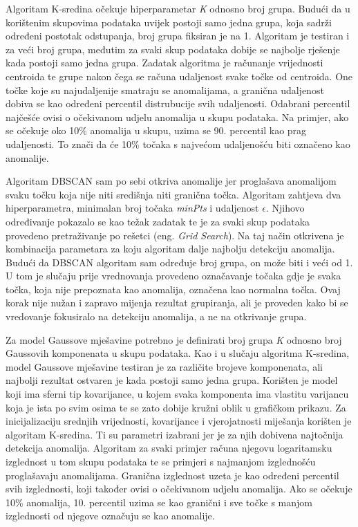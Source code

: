 \documentclass[utf8, diplomski, numeric]{fer}
\begin{document}
Algoritam K-sredina očekuje hiperparametar \textit{K} odnosno broj grupa. Budući da u korištenim skupovima podataka uvijek postoji samo jedna grupa, koja sadrži određeni postotak odstupanja, broj grupa fiksiran je na 1. Algoritam je testiran i za veći broj grupa, međutim za svaki skup podataka dobije se najbolje rješenje kada postoji samo jedna grupa. Zadatak algoritma je računanje vrijednosti centroida te grupe nakon čega se računa udaljenost svake točke od centroida. One točke koje su najudaljenije smatraju se anomalijama, a granična udaljenost dobiva se kao određeni percentil distrubucije svih udaljenosti. Odabrani percentil najčešće ovisi o očekivanom udjelu anomalija u skupu podataka. Na primjer, ako se očekuje oko 10\% anomalija u skupu, uzima se 90. percentil kao prag udaljenosti. To znači da će 10\% točaka s najvećom udaljenošću biti označeno kao anomalije.

Algoritam DBSCAN sam po sebi otkriva anomalije jer proglašava anomalijom svaku točku koja nije niti središnja niti granična točka. Algoritam zahtjeva dva hiperparametra, minimalan broj točaka \textit{minPts} i udaljenost $\epsilon$. Njihovo određivanje pokazalo se kao težak zadatak te je za svaki skup podataka provedeno pretraživanje po rešetci (eng. \textit{Grid Search}). Na taj način otkrivena je kombinacija parametara za koju algoritam dalje najbolju detekciju anomalija. Budući da DBSCAN algoritam sam određuje broj grupa, on može biti i veći od 1. U tom je slučaju prije vrednovanja provedeno označavanje točaka gdje je svaka točka, koja nije prepoznata kao anomalija, označena kao normalna točka. Ovaj korak nije nužan i zapravo mijenja rezultat grupiranja, ali je proveden kako bi se vredovanje fokusiralo na detekciju anomalija, a ne na otkrivanje grupa.

Za model Gaussove mješavine potrebno je definirati broj grupa \textit{K} odnosno broj Gaussovih komponenata u skupu podataka. Kao i u slučaju algoritma K-sredina, model Gaussove mješavine testiran je za različite brojeve komponenata, ali najbolji rezultat ostvaren je kada postoji samo jedna grupa. Korišten je model koji ima sferni tip kovarijance, u kojem svaka komponenta ima vlastitu varijancu koja je ista po svim osima te se zato dobije kružni oblik u grafičkom prikazu. Za inicijalizaciju srednjih vrijednosti, kovarijance i vjerojatnosti miješanja korišten je algoritam K-sredina. Ti su parametri izabrani jer je za njih dobivena najtočnija detekcija anomalija. Algoritam za svaki primjer računa njegovu logaritamsku izglednost u tom skupu podataka te se primjeri s najmanjom izglednošću proglašavaju anomalijama. Granična izglednost uzeta je kao određeni percentil svih izglednosti, koji također ovisi o očekivanom udjelu anomalija. Ako se očekuje 10\% anomalija, 10. percentil uzima se kao granični i sve točke s manjom izglednosti od njegove označuju se kao anomalije.
\end{document}
